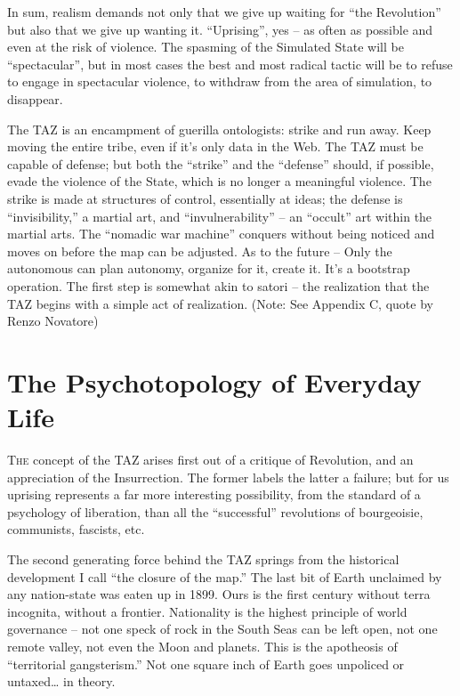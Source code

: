 \documentclass[a4paper,english,10pt,twoside]{article}
\begin{document}
\medskip
In sum, realism demands not only that we give up waiting for \enquote{the Revolution} but also that we give up wanting it. \enquote{Uprising}, yes -- as often as possible and even at the risk of violence. The spasming of the Simulated State will be \enquote{spectacular}, but in most cases the best and most radical tactic will be to refuse to engage in spectacular violence, to withdraw from the area of simulation, to disappear.

\medskip
The TAZ is an encampment of guerilla ontologists: strike and run away. Keep moving the entire tribe, even if it's only data in the Web. The TAZ must be capable of defense; but both the \enquote{strike} and the \enquote{defense} should, if possible, evade the violence of the State, which is no longer a meaningful violence. The strike is made at structures of control, essentially at ideas; the defense is \enquote{invisibility,} a martial art, and \enquote{invulnerability} -- an \enquote{occult} art within the martial arts. The \enquote{nomadic war machine} conquers without being noticed and moves on before the map can be adjusted. As to the future -- Only the autonomous can plan autonomy, organize for it, create it. It's a bootstrap operation. The first step is somewhat akin to satori -- the realization that the TAZ begins with a simple act of realization. (Note: See Appendix C, quote by Renzo Novatore)

\section{The Psychotopology of Everyday Life}

\lettrine{T}{he} concept of the TAZ arises first out of a critique of Revolution, and an appreciation of the Insurrection. The former labels the latter a failure; but for us uprising represents a far more interesting possibility, from the standard of a psychology of liberation, than all the \enquote{successful} revolutions of bourgeoisie, communists, fascists, etc.

\medskip
The second generating force behind the TAZ springs from the historical development I call \enquote{the closure of the map.} The last bit of Earth unclaimed by any nation-state was eaten up in 1899. Ours is the first century without terra incognita, without a frontier. Nationality is the highest principle of world governance -- not one speck of rock in the South Seas can be left open, not one remote valley, not even the Moon and planets. This is the apotheosis of \enquote{territorial gangsterism.} Not one square inch of Earth goes unpoliced or untaxed… in theory.
\end{document}
